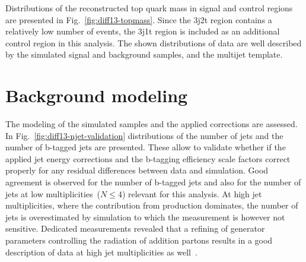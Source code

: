Distributions of the reconstructed top quark mass in signal and control regions are presented in Fig.~\ref{fig:diff13-topmass}. Since the 3j2t region contains a relatively low number of events, the 3j1t region is included as an additional \ttbar control region in this analysis. The shown distributions of data are well described by the simulated signal and background samples, and the multijet template.

 


\section{Background modeling}
\label{sec:diff13-modeling}

The modeling of the simulated samples and the applied corrections are assessed. In Fig.~\ref{fig:diff13-njet-validation} distributions of the number of jets and the number of b-tagged jets are presented. These allow to validate whether if the applied jet energy corrections and the b-tagging efficiency scale factors correct properly for any residual differences between data and simulation. Good agreement is observed for the number of b-tagged jets and also for the number of jets at low multiplicities~($N\leq4$) relevant for this analysis. At high jet multiplicities, where the contribution from \ttbar production dominates, the number of jets is overestimated by simulation to which the measurement is however not sensitive. Dedicated \ttbar measurements revealed that a refining of generator parameters controlling the radiation of addition partons results in a good description of data at high jet multiplicities as well~\cite{CMS-PAS-TOP-16-021}.

